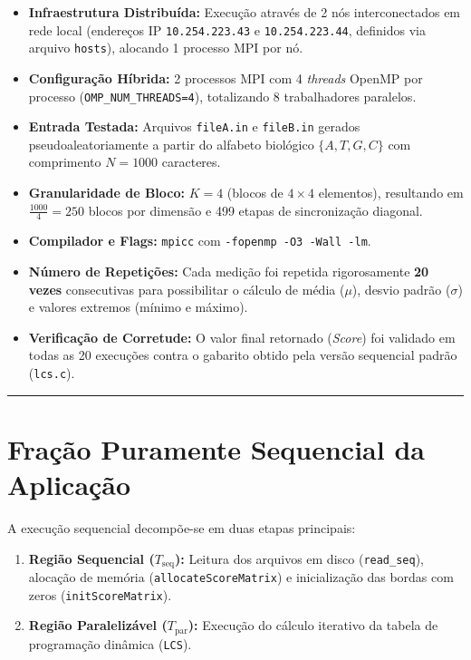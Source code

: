 \documentclass[12pt,a4paper]{article}
\begin{document}
\begin{itemize}
    \item \textbf{Infraestrutura Distribuída:} Execução através de 2 nós interconectados em rede local (endereços IP \texttt{10.254.223.43} e \texttt{10.254.223.44}, definidos via arquivo \texttt{hosts}), alocando 1 processo MPI por nó.
    \item \textbf{Configuração Híbrida:} 2 processos MPI com 4 \textit{threads} OpenMP por processo (\texttt{OMP\_NUM_THREADS=4}), totalizando 8 trabalhadores paralelos.
    \item \textbf{Entrada Testada:} Arquivos \texttt{fileA.in} e \texttt{fileB.in} gerados pseudoaleatoriamente a partir do alfabeto biológico $\{A, T, G, C\}$ com comprimento $N = 1000$ caracteres.
    \item \textbf{Granularidade de Bloco:} $K = 4$ (blocos de $4 \times 4$ elementos), resultando em $\frac{1000}{4} = 250$ blocos por dimensão e 499 etapas de sincronização diagonal.
    \item \textbf{Compilador e Flags:} \texttt{mpicc} com \texttt{-fopenmp -O3 -Wall -lm}.
    \item \textbf{Número de Repetições:} Cada medição foi repetida rigorosamente \textbf{20 vezes} consecutivas para possibilitar o cálculo de média ($\mu$), desvio padrão ($\sigma$) e valores extremos (mínimo e máximo).
    \item \textbf{Verificação de Corretude:} O valor final retornado (\textit{Score}) foi validado em todas as 20 execuções contra o gabarito obtido pela versão sequencial padrão (\texttt{lcs.c}).
\end{itemize}

\vspace{0.5cm}
\hrule
\vspace{0.5cm}

\section{Fração Puramente Sequencial da Aplicação}

A execução sequencial decompõe-se em duas etapas principais:
\begin{enumerate}
    \item \textbf{Região Sequencial ($T_{\text{seq}}$):} Leitura dos arquivos em disco (\texttt{read\_seq}), alocação de memória (\texttt{allocateScoreMatrix}) e inicialização das bordas com zeros (\texttt{initScoreMatrix}).
    \item \textbf{Região Paralelizável ($T_{\text{par}}$):} Execução do cálculo iterativo da tabela de programação dinâmica (\texttt{LCS}).
\end{enumerate}
\end{document}
